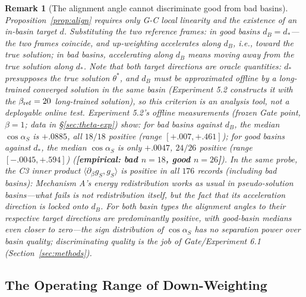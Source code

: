 \documentclass[11pt]{article}
\newtheorem*{remark}{Remark}
\numberwithin{equation}{section}
\begin{document}
\begin{remark}[The alignment angle cannot discriminate good from bad basins]\label{rem:align-emp}
Proposition~\ref{prop:align} requires only G-C local linearity and the existence of an in-basin target $d$. Substituting the two reference frames: in good basins $d_B=d_*$---the two frames coincide, and up-weighting accelerates along $d_B$, i.e., toward the true solution; in bad basins, accelerating along $d_B$ means moving \emph{away from the true solution} along $d_*$. Note that both target directions are \emph{oracle quantities}: $d_*$ presupposes the true solution $\theta^*$, and $d_B$ must be approximated offline by a long-trained converged solution in the same basin (Experiment 5.2 constructs it with the $\beta_{\rm ref}=20$ long-trained solution), so this criterion is an analysis tool, not a deployable online test. Experiment 5.2's offline measurements (frozen Gate point, $\beta=1$; data in \S\ref{sec:theta-exp}) show: for bad basins against $d_B$, the median $\cos\alpha_S$ is $+.0885$, all $18/18$ positive (range $[+.007,+.461]$); for good basins against $d_*$, the median $\cos\alpha_S$ is only $+.0047$, $24/26$ positive (range $[-.0045,+.594]$) (\textbf{[empirical: bad $n=18$, good $n=26$]}). In the same probe, the C3 inner product $\langle\partial_\beta g_S,g_S\rangle$ is positive in all $176$ records (including bad basins): Mechanism A's energy redistribution works as usual in pseudo-solution basins---what fails is not redistribution itself, but the fact that its acceleration direction is locked onto $d_B$. For both basin types the alignment angles to their respective target directions are predominantly positive, with good-basin medians even closer to zero---the sign distribution of $\cos\alpha_S$ has no separation power over basin quality; discriminating quality is the job of Gate/Experiment 6.1 (Section~\ref{sec:methods}).
\end{remark}

\subsection{The Operating Range of Down-Weighting}\label{sec:theta-down}
\end{document}
